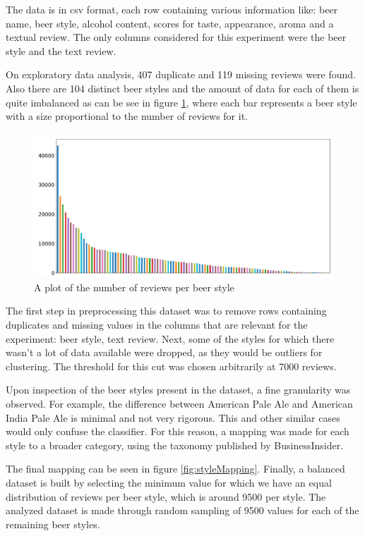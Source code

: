 \documentclass[12pt]{article}
\begin{document}
	The data is in csv format, each row containing various information like: beer name, beer style, alcohol content, scores for taste, appearance, aroma and a textual review. The only columns considered for this experiment were the beer style and the text review.
	
	On exploratory data analysis, 407 duplicate and 119 missing reviews were found. Also there are 104 distinct beer styles and the amount of data for each of them is quite imbalanced as can be see in figure \ref{fig:initialDistribution}, where each bar represents a beer style with a size proportional to the number of reviews for it.
	
	\begin{figure}[h]
		\includegraphics[width=\linewidth]{resources/InitialDistribution.png}
		\caption{A plot of the number of reviews per beer style}
		\label{fig:initialDistribution}
	\end{figure}

	The first step in preprocessing this dataset was to remove rows containing duplicates and missing values in the columns that are relevant for the experiment: beer style, text review. Next, some of the styles for which there wasn't a lot of data available were dropped, as they would be outliers for clustering. The threshold for this cut was chosen arbitrarily at 7000 reviews. 
	
	Upon inspection of the beer styles present in the dataset, a fine granularity was observed. For example, the difference between American Pale Ale and American India Pale Ale is minimal and not very rigorous. This and other similar cases would only confuse the classifier. For this reason, a mapping was made for each style to a broader category, using the taxonomy published by BusinessInsider\cite{BeerTaxonomy}. 
	
	The final mapping can be seen in figure \ref{fig:styleMapping}. Finally, a balanced dataset is built by selecting the minimum value for which we have an equal distribution of reviews per beer style, which is around 9500 per style. The analyzed dataset is made through random sampling of 9500 values for each of the remaining beer styles.
	
\end{document}
